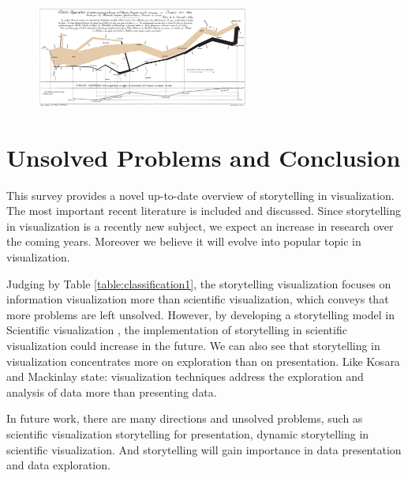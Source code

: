 \documentclass{egpubl}
\begin{document}
\begin{figure}
\begingroup
\centering
\includegraphics[width=7cm]{./images/StorytellingTheNextStepForVisualisation}
\label{fig:StorytellingTheNextStepForVisualisation}
\endgroup
\end{figure}

\section{Unsolved Problems and Conclusion}
This survey provides a novel up-to-date overview of storytelling in visualization. The most important recent literature is included and discussed. Since storytelling in visualization is a recently new subject, we expect an increase in research over the coming years. Moreover we believe it will evolve into popular topic in visualization.

Judging by Table \ref{table:classification1}, the storytelling visualization focuses on information visualization more than scientific visualization, which conveys that more problems are left unsolved. However, by developing a storytelling model in Scientific visualization \cite{wohlfart2}, the implementation of storytelling in scientific visualization could increase in the future. We can also see that  storytelling in visualization concentrates more on exploration than on presentation. Like  Kosara and Mackinlay \cite{Kosara} state: visualization techniques address the exploration and analysis of data more than presenting data.

In future work, there are many directions and unsolved problems, such as scientific visualization storytelling for presentation, dynamic storytelling in scientific visualization. And storytelling will gain importance in data presentation and data exploration.
\end{document}
